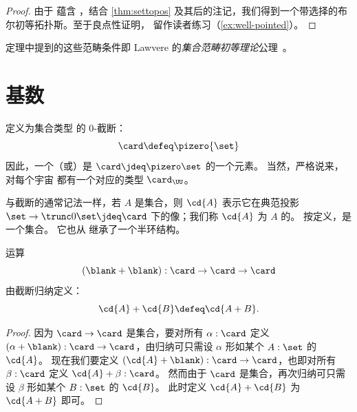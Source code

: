 \begin{proof}
  由于 \choice{} 蕴含 \LEM{}，结合 \cref{thm:settopos} 及其后的注记，我们得到一个带选择的布尔初等拓扑斯。至于良点性证明，
留作读者练习（\cref{ex:well-pointed}）。
\end{proof}

\begin{rmk}
  定理中提到的这些范畴条件即 Lawvere
  的\emph{集合范畴初等理论}公理~\cite{lawvere:etcs-long}。
\end{rmk}
\section{基数}
\label{sec:cardinals}

\begin{defn}\label{defn:card}
  定义为集合类型 \set 的 0-截断：
  \[ \card \defeq \pizero{\set} \]
  因此，一个（或）是 $\card\jdeq \pizero\set$ 的一个元素。
  当然，严格说来，对每个宇宙 \type 都有一个对应的类型 $\card_\UU$。
\end{defn}



与截断的通常记法一样，若 $A$ 是集合，则 $\cd{A}$ 表示它在典范投影 $\set \to \trunc0\set \jdeq \card$ 下的像；我们称 $\cd{A}$ 为 $A$ 的。
按定义，\card 是一个集合。
它也从 \set 继承了一个半环结构。

\begin{defn}
  运算
  \[ (\blank+\blank) : \card \to \card \to \card \]
  由截断归纳定义：
  \[ \cd{A} + \cd{B} \defeq \cd{A+B}.\]
\end{defn}
\begin{proof}
  因为 $\card\to\card$ 是集合，要对所有 $\alpha:\card$ 定义 $(\alpha+\blank):\card\to\card$，由归纳可只需设 $\alpha$ 形如某个 $A:\set$ 的 $\cd{A}$。
  现在我们要定义 $(\cd{A}+\blank) :\card\to\card$，也即对所有 $\beta:\card$ 定义 $\cd{A}+\beta :\card$。
  然而由于 $\card$ 是集合，再次归纳可只需设 $\beta$ 形如某个 $B:\set$ 的 $\cd{B}$。
  此时定义 $\cd{A}+\cd{B}$ 为 $\cd{A+B}$ 即可。
\end{proof}

